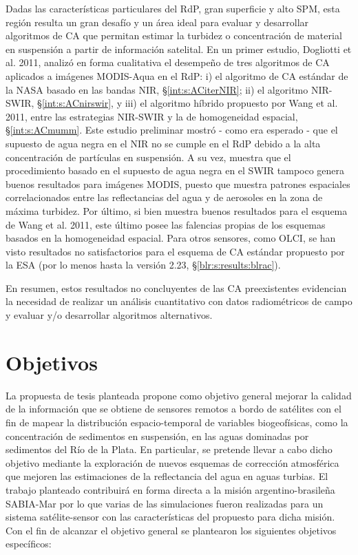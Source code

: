     Dadas las características particulares del RdP, gran superficie y alto SPM, esta región resulta un gran desafío y un área ideal para evaluar y desarrollar algoritmos de CA que permitan estimar la turbidez o concentración de  material en suspensión a partir de información satelital. En un primer estudio, Dogliotti et al. 2011, \cite{dogliotti2011} analizó en forma cualitativa el desempeño de tres algoritmos de CA aplicados a imágenes MODIS-Aqua en el RdP: i) el algoritmo de CA estándar de la NASA basado en las bandas NIR, \S \ref{int:s:ACiterNIR}; ii) el algoritmo NIR-SWIR, \S \ref{int:s:ACnirswir}, y iii) el algoritmo híbrido propuesto por Wang et al. 2011, \cite{wang2011} entre las estrategias NIR-SWIR y la de homogeneidad espacial, \S \ref{int:s:ACmumm}. Este estudio preliminar mostró - como era esperado - que el supuesto de agua negra en el NIR no se cumple en el RdP debido a la alta concentración de partículas en suspensión. A su vez, muestra que el procedimiento basado en el supuesto de agua negra en el SWIR tampoco genera buenos resultados para imágenes MODIS, puesto que muestra patrones espaciales correlacionados entre las reflectancias del agua y de aerosoles en la zona de máxima turbidez. Por último, si bien muestra buenos resultados para el esquema de Wang et al. 2011, este último posee las falencias propias de los esquemas basados en la homogeneidad espacial. Para otros sensores, como OLCI, se han visto resultados no satisfactorios para el esquema de CA estándar propuesto por la ESA (por lo menos hasta la versión 2.23, \S \ref{blr:s:results:blrac}).
    
    En resumen, estos resultados no concluyentes de las CA preexistentes evidencian la necesidad de realizar un análisis cuantitativo con datos radiométricos de campo y evaluar y/o desarrollar algoritmos alternativos.

\section{Objetivos}
\label{int:s:objetivos}
    La propuesta de tesis planteada propone como objetivo general mejorar la calidad de la información que se obtiene de sensores remotos a bordo de satélites con el fin de mapear la distribución espacio-temporal de variables biogeofísicas, como  la concentración de sedimentos en suspensión, en las aguas dominadas por sedimentos del Río de la Plata. En particular, se pretende llevar a cabo dicho objetivo mediante la exploración de nuevos esquemas de corrección atmosférica que mejoren las estimaciones de la reflectancia del agua en aguas turbias. El trabajo planteado contribuirá en forma directa a la misión argentino-brasileña SABIA-Mar por lo que varias de las simulaciones fueron realizadas para un sistema satélite-sensor con las características del propuesto para dicha misión. Con el fin de alcanzar el objetivo general se plantearon los siguientes objetivos específicos:
    
